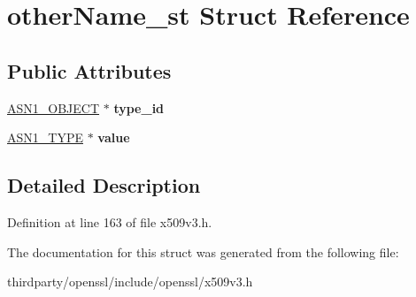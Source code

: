 \hypertarget{structother_name__st}{}\section{other\+Name\+\_\+st Struct Reference}
\label{structother_name__st}
\subsection*{Public Attributes}
\begin{DoxyCompactItemize}
\item 
\mbox{\label{structother_name__st_a6a75851c46b8796a1f986ef545d423a6}} 
\hyperlink{structasn1__object__st}{A\+S\+N1\+\_\+\+O\+B\+J\+E\+CT} $\ast$ {\bfseries type\+\_\+id}
\item 
\mbox{\label{structother_name__st_a490a0f0d33dd8e1b7a2283b6da0951d5}} 
\hyperlink{structasn1__type__st}{A\+S\+N1\+\_\+\+T\+Y\+PE} $\ast$ {\bfseries value}
\end{DoxyCompactItemize}


\subsection{Detailed Description}


Definition at line 163 of file x509v3.\+h.



The documentation for this struct was generated from the following file\+:\begin{DoxyCompactItemize}
\item 
thirdparty/openssl/include/openssl/x509v3.\+h\end{DoxyCompactItemize}
